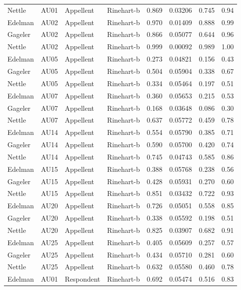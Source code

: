 \documentclass{monashthesis}
\begin{document}
\begin{center}
\begin{longtable}{llllllll}
Nettle & AU01 & Appellent & Rinehart-b & 0.869 & 0.03206 & 0.745 & 0.94 \\
Edelman & AU02 & Appellent & Rinehart-b & 0.970 & 0.01409 & 0.888 & 0.99 \\
Gageler & AU02 & Appellent & Rinehart-b & 0.866 & 0.05077 & 0.644 & 0.96 \\
Nettle & AU02 & Appellent & Rinehart-b & 0.999 & 0.00092 & 0.989 & 1.00 \\
Edelman & AU05 & Appellent & Rinehart-b & 0.273 & 0.04821 & 0.156 & 0.43 \\
Gageler & AU05 & Appellent & Rinehart-b & 0.504 & 0.05904 & 0.338 & 0.67 \\
Nettle & AU05 & Appellent & Rinehart-b & 0.334 & 0.05464 & 0.197 & 0.51 \\
Edelman & AU07 & Appellent & Rinehart-b & 0.360 & 0.05653 & 0.215 & 0.53 \\
Gageler & AU07 & Appellent & Rinehart-b & 0.168 & 0.03648 & 0.086 & 0.30 \\
Nettle & AU07 & Appellent & Rinehart-b & 0.637 & 0.05772 & 0.459 & 0.78 \\
Edelman & AU14 & Appellent & Rinehart-b & 0.554 & 0.05790 & 0.385 & 0.71 \\
Gageler & AU14 & Appellent & Rinehart-b & 0.590 & 0.05700 & 0.420 & 0.74 \\
Nettle & AU14 & Appellent & Rinehart-b & 0.745 & 0.04743 & 0.585 & 0.86 \\
Edelman & AU15 & Appellent & Rinehart-b & 0.388 & 0.05768 & 0.238 & 0.56 \\
Gageler & AU15 & Appellent & Rinehart-b & 0.428 & 0.05931 & 0.270 & 0.60 \\
Nettle & AU15 & Appellent & Rinehart-b & 0.851 & 0.03432 & 0.722 & 0.93 \\
Edelman & AU20 & Appellent & Rinehart-b & 0.726 & 0.05051 & 0.558 & 0.85 \\
Gageler & AU20 & Appellent & Rinehart-b & 0.338 & 0.05592 & 0.198 & 0.51 \\
Nettle & AU20 & Appellent & Rinehart-b & 0.825 & 0.03907 & 0.682 & 0.91 \\
Edelman & AU25 & Appellent & Rinehart-b & 0.405 & 0.05609 & 0.257 & 0.57 \\
Gageler & AU25 & Appellent & Rinehart-b & 0.434 & 0.05710 & 0.281 & 0.60 \\
Nettle & AU25 & Appellent & Rinehart-b & 0.632 & 0.05580 & 0.460 & 0.78 \\
Edelman & AU01 & Respondent & Rinehart-b & 0.692 & 0.05474 & 0.516 & 0.83 \\

\end{longtable}
\end{center}
\end{document}
